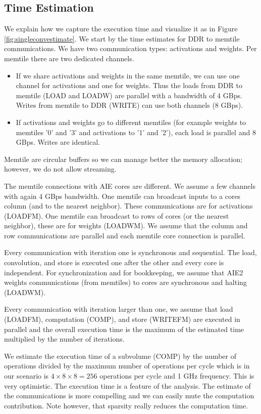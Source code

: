 \documentclass{IEEEtran}
\begin{document}
\subsection{Time Estimation}
We explain how we capture the execution time and visualize it as in
Figure \ref{fig:singleconvestimate}. We start by the time estimates
for DDR to memtile communications. We have two communication types:
activations and weights. Per memtile there are two dedicated channels.
\begin{itemize}
 \item If we share activations and weights in the same memtile, we can
   use one channel for activations and one for weights. Thus the loads
   from DDR to memtile (LOAD and LOADW) are parallel with a bandwidth
   of 4 GBps. Writes from memtile to DDR (WRITE) can use both channels
   (8 GBps).

 \item If activations and weights go to different memtiles (for
   example weights to memtiles '0' and '3' and activations to '1' and
   '2'), each load is parallel and 8 GBps. Writes are identical.
\end{itemize}
Memtile are circular buffers so we can manage better the memory
allocation; however, we do not allow streaming.
   
The memtile connections with AIE cores are different. We assume a few
channels with again 4 GBps bandwidth. One memtile can broadcast
inputs to a cores column (and to the nearest neighbor). These
communications are for activations (LOADFM). One memtile can broadcast
to rows of cores (or the nearest neighbor), these are for weights
(LOADWM). We assume that the column and row communications are
parallel and each memtile core connection is parallel.

Every communication with iteration one is synchronous and sequential.
The load, convolution, and store is executed one after the other and
every core is independent.  For synchronization and for bookkeeping,
we assume that AIE2 weights communications (from memtiles) to cores are
synchronous and halting (LOADWM).

Every communication with iteration larger than one, we assume that
load (LOADFM), computation (COMP), and store (WRITEFM) are executed in
parallel and the overall execution time is the maximum of the
estimated time multiplied by the number of iterations.

We estimate the execution time of a subvolume (COMP) by the number of
operations divided by the maximum number of operations per cycle which
is in our scenario is $4\times 8 \times 8 = 256 $ operations per cycle
and 1 GHz frequency. This is very optimistic. The execution time is a
feature of the analysis. The estimate of the communications is more
compelling and we can easily mute the computation contribution. Note
however, that sparsity really reduces the computation time.
\end{document}
